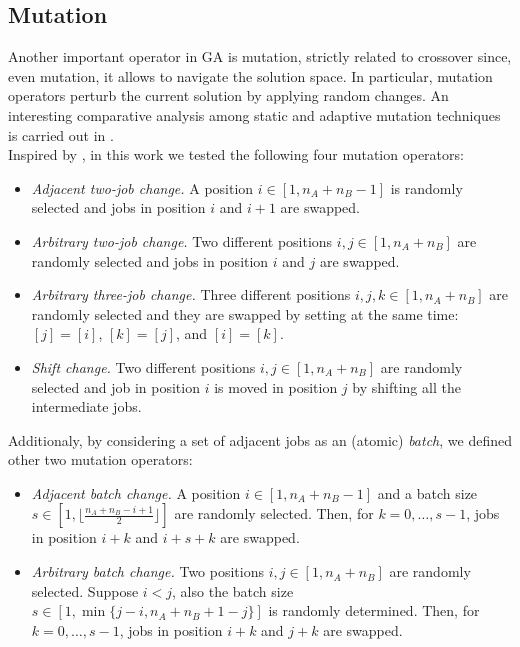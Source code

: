 \documentclass[opre,nonblindrev]{informs3} %
\begin{document}
\subsection{Mutation}
Another important operator in GA is mutation, strictly related to crossover since, even mutation, it allows to navigate the solution space. In particular, mutation operators perturb the current solution by applying random changes. An interesting comparative analysis among static and adaptive mutation techniques is carried out in \cite{mut1}.\\
Inspired by \cite{sched1}, in this work we tested the following four mutation operators:
\begin{itemize}
	\item \textit{Adjacent two-job change.} A position $i \in [1,n_A+n_B-1]$ is randomly selected and jobs in position $i$ and $i+1$ are swapped.
	\item \textit{Arbitrary two-job change.} Two different positions $i,j \in [1,n_A+n_B]$ are randomly selected and jobs in position $i$ and $j$ are swapped.
	\item \textit{Arbitrary three-job change.} Three different positions $i,j,k \in [1,n_A+n_B]$ are randomly selected and they are swapped by setting at the same time: $[j] = [i]$, $[k] = [j]$, and $[i] = [k]$. 
	\item \textit{Shift change.} Two different positions $i,j \in [1,n_A+n_B]$ are randomly selected and job in position $i$ is moved in position $j$ by shifting all the intermediate jobs.
\end{itemize} 
Additionaly, by considering a set of adjacent jobs as an (atomic) \textit{batch}, we defined other two mutation operators:
\begin{itemize}
	\item \textit{Adjacent batch change.} A position $i \in [1,n_A+n_B-1]$ and a batch size $s \in [1,\lfloor{\frac{n_A+n_B-i+1}{2}}\rfloor]$ are randomly selected. Then, for $k=0,\ldots,s-1$, jobs in position $i+k$ and $i+s+k$ are swapped.
	\item \textit{Arbitrary batch change.} Two positions $i,j \in [1,n_A+n_B]$ are randomly selected. Suppose $i<j$, also the batch size $s \in [1, \min\{j-i,n_A+n_B+1-j\}]$ is randomly determined. Then, for $k=0,\ldots,s-1$, jobs in position $i+k$ and $j+k$ are swapped. 
\end{itemize}
\end{document}
